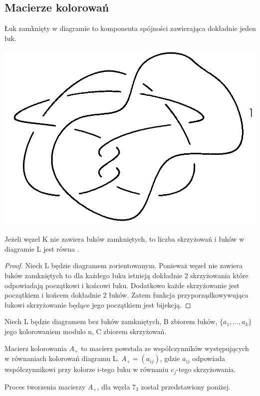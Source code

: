 \subsection{Macierze kolorowań}
\begin{definicja}
Łuk zamknięty w diagramie to komponenta spójności zawierająca dokładnie jeden łuk.
\end{definicja}
\begin{center}
\includegraphics[scale=0.2]{2/Obrazy/Clossedcurve} \\

\end{center}

\begin{lemat}
Jeżeli węzeł K nie zawiera łuków zamkniętych, to liczba skrzyżowań i łuków w diagramie L jest równa .
\end{lemat}
\begin{proof}
Niech L będzie diagramem zorientowanym. Ponieważ węzeł nie zawiera łuków zamkniętych to dla każdego łuku istnieją dokładnie 2 skrzyżowania które odpowiadają początkowi i końcowi łuku. Dodatkowo każde skrzyżowanie jest początkiem i końcem dokładnie 2 łuków. Zatem funkcja przyporządkowywująca łukowi skrzyżowanie będące jego początkiem jest bijekcją.
\end{proof}


Niech L będzie diagramem bez łuków zamkniętych, B zbiorem łuków, $\lbrace a_{1}, \ldots, a_{k}\rbrace$ jego kolorowaniem modulo n, C zbiorem skrzyżowań.  
\begin{definicja}
Macierz kolorowania $A_{+}$ to macierz powstała ze współczynników występujących w równaniach kolorowań diagramu L. $A_{+}=(a_{ij})$, gdzie  $a_{ij}$ odpowiada współczynnikowi przy kolorze i-tego łuku w równaniu $c_{j}$-tego skrzyżowania. 
\end{definicja}
Proces tworzenia macierzy $A_{+}$, dla węzła $7_{3}$ został przedstawiony poniżej. \\

